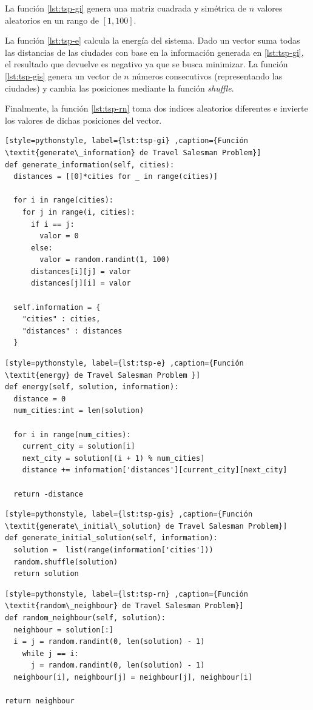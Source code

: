 \documentclass[12pt,twoside]{article}
\begin{document}
La función \ref{lst:tsp-gi} genera una matriz cuadrada y simétrica de $n$ valores aleatorios en un rango de $[1, 100]$.

La función \ref{lst:tsp-e} calcula la energía del sistema. Dado un vector suma todas las distancias de las ciudades con base en la información generada en \ref{lst:tsp-gi}, el resultado que devuelve es negativo ya que se busca minimizar. La función \ref{lst:tsp-gis} genera un vector de $n$ números consecutivos (representando las ciudades) y cambia las posiciones mediante la función \textit{shuffle}.

Finalmente, la función \ref{lst:tsp-rn} toma dos indices aleatorios diferentes e invierte los valores de dichas posiciones del vector.

\begin{lstlisting}[style=pythonstyle, label={lst:tsp-gi} ,caption={Función \textit{generate\_information} de Travel Salesman Problem}]
def generate_information(self, cities):
  distances = [[0]*cities for _ in range(cities)]

  for i in range(cities):
	for j in range(i, cities):  
	  if i == j:
	    valor = 0  
	  else:
		valor = random.randint(1, 100)
	  distances[i][j] = valor
	  distances[j][i] = valor 

  self.information = {
	"cities" : cities,
	"distances" : distances
  }
\end{lstlisting}

\begin{lstlisting}[style=pythonstyle, label={lst:tsp-e} ,caption={Función \textit{energy} de Travel Salesman Problem }]
def energy(self, solution, information):
  distance = 0
  num_cities:int = len(solution)

  for i in range(num_cities):
	current_city = solution[i]
	next_city = solution[(i + 1) % num_cities]  
	distance += information['distances'][current_city][next_city]

  return -distance
\end{lstlisting}

\begin{lstlisting}[style=pythonstyle, label={lst:tsp-gis} ,caption={Función \textit{generate\_initial\_solution} de Travel Salesman Problem}]
def generate_initial_solution(self, information):
  solution =  list(range(information['cities']))
  random.shuffle(solution)
  return solution     
\end{lstlisting}

\begin{lstlisting}[style=pythonstyle, label={lst:tsp-rn} ,caption={Función \textit{random\_neighbour} de Travel Salesman Problem}]
def random_neighbour(self, solution):
  neighbour = solution[:]
  i = j = random.randint(0, len(solution) - 1)
 	while j == i:
	  j = random.randint(0, len(solution) - 1)
  neighbour[i], neighbour[j] = neighbour[j], neighbour[i]

return neighbour
\end{lstlisting}
\end{document}
